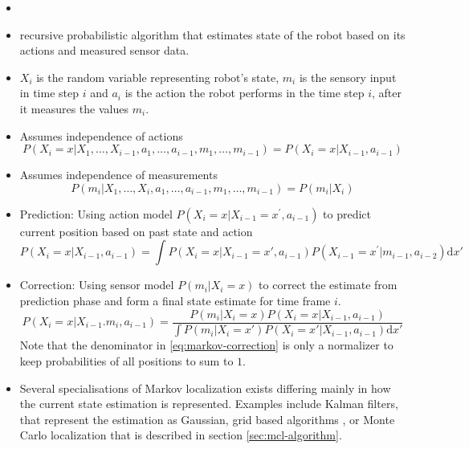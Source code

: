 \begin{itemize}
\item \cite{fox98,diard}
\item recursive probabilistic algorithm that estimates state of the robot based
	on its actions and measured sensor data.
\item \(X_i\) is the random variable representing robot's state,
	\(m_i\) is the sensory input in time step \(i\) and \(a_i\) is the action the
	robot performs in the time step \(i\), after it measures the values \(m_i\).
\item Assumes independence of actions
	\begin{equation}
		P(X_i = x | X_1, \dotsc, X_{i - 1}, a_1, \dotsc, a_{i - 1},
		m_1, \dotsc, m_{i - 1}) = 
		P(X_i = x | X_{i - 1}, a_{i - 1})
	\end{equation}
\item Assumes independence of measurements
	\begin{equation}
		P(m_i | X_1, \dotsc, X_i, a_1, \dotsc, a_{i - 1},
		m_1, \dotsc, m_{i - 1}) = 
		P(m_i | X_i)
	\end{equation}
\item Prediction:
Using action model \(P(X_i = x | X_{i-1} = x^\prime, a_{i - 1})\) to predict
current position based on past state and action
	\begin{equation}
		\label{eq:markov-prediction}
		P(X_i = x | X_{i - 1}, a_{i - 1}) =
		\int
		P(X_i = x | X_{i - 1} = x', a_{i - 1})
		P(X_{i - 1} = x^\prime | m_{i - 1}, a_{i - 2})
		\mathrm{d}x'
	\end{equation}

\item Correction:
Using sensor model \(P(m_i | X_i = x)\) to correct the estimate from prediction phase
and form a final state estimate for time frame \(i\).
	\begin{equation}
	\label{eq:markov-correction}
	P(X_i = x | X_{i-1}. m_i, a_{i - 1}) =
		\frac
			{P(m_i | X_i = x) P(X_i = x | X_{i - 1}, a_{i - 1})}
			{
			\int
			P(m_i | X_i = x') P(X_i = x' | X_{i - 1}, a_{i - 1})
			\mathrm{d}x'
			}
	\end{equation}
	Note that the denominator in \eqref{eq:markov-correction} is only a normalizer to
	keep probabilities of all positions to sum to \(1\). 
\item Several specialisations of Markov localization exists differing mainly in how the
	current state estimation is represented.
	Examples include Kalman filters, that represent the estimation as Gaussian,
	grid based algorithms \cite{fox98}, or Monte Carlo localization
	that is described in section \ref{sec:mcl-algorithm}.
\end{itemize}


